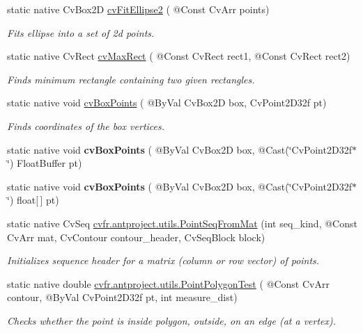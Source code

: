 \begin{DoxyCompactItemize}
\item 
static native Cv\+Box2D \hyperlink{group__imgproc__c_ga417295a4b5e1071f6af64972132cecac}{cv\+Fit\+Ellipse2} ( @Const Cv\+Arr points)
\begin{DoxyCompactList}\small\item\em Fits ellipse into a set of 2d points. \end{DoxyCompactList}\item 
static native Cv\+Rect \hyperlink{group__imgproc__c_ga3861a1015ad4bb47dd5ac88cf57b9cde}{cv\+Max\+Rect} ( @Const Cv\+Rect rect1, @Const Cv\+Rect rect2)
\begin{DoxyCompactList}\small\item\em Finds minimum rectangle containing two given rectangles. \end{DoxyCompactList}\item 
static native void \hyperlink{group__imgproc__c_ga9832ef1547e4d1a64768e2d09aefa8ce}{cv\+Box\+Points} ( @By\+Val Cv\+Box2D box, Cv\+Point2\+D32f pt)
\begin{DoxyCompactList}\small\item\em Finds coordinates of the box vertices. \end{DoxyCompactList}\item 
static native void {\bfseries cv\+Box\+Points} ( @By\+Val Cv\+Box2D box, @Cast(\char`\"{}Cv\+Point2\+D32f$\ast$\char`\"{}) Float\+Buffer pt)
\item 
static native void {\bfseries cv\+Box\+Points} ( @By\+Val Cv\+Box2D box, @Cast(\char`\"{}Cv\+Point2\+D32f$\ast$\char`\"{}) float\mbox{[}$\,$\mbox{]} pt)
\item 
static native Cv\+Seq \hyperlink{group__imgproc__c_ga75ebb68fece47bfb144af0ad2a86668e}{cv\+fr.antproject.utils.Point\+Seq\+From\+Mat} (int seq\+\_\+kind, @Const Cv\+Arr mat, Cv\+Contour contour\+\_\+header, Cv\+Seq\+Block block)
\begin{DoxyCompactList}\small\item\em Initializes sequence header for a matrix (column or row vector) of points. \end{DoxyCompactList}\item 
static native double \hyperlink{group__imgproc__c_ga9702f652ace9af304514bd89286968b5}{cv\+fr.antproject.utils.Point\+Polygon\+Test} ( @Const Cv\+Arr contour, @By\+Val Cv\+Point2\+D32f pt, int measure\+\_\+dist)
\begin{DoxyCompactList}\small\item\em Checks whether the point is inside polygon, outside, on an edge (at a vertex). \end{DoxyCompactList}\item 

\end{DoxyCompactItemize}

